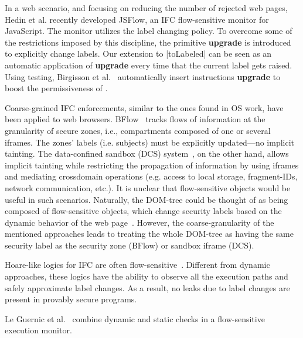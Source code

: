 In a web scenario, and focusing on reducing the number of rejected web pages,
Hedin et al. \citep{Hedin13} recently developed JSFlow, an IFC flow-sensitive
monitor for JavaScript. The monitor utilizes the {\nsu} label changing policy. To overcome some of the restrictions imposed by this discipline, the
primitive \textbf{upgrade} is introduced to explicitly change labels. Our
extension to |toLabeled| can be seen as an automatic application of
\textbf{upgrade} every time that the current label gets raised. Using testing,
Birgisson et al.~\citep{Arnar2012} automatically insert instructions
\textbf{upgrade} to boost the permissiveness of {\nsu}. 



Coarse-grained IFC enforcements, similar to the ones found in OS work, have been
applied to web browsers. BFlow~\citep{Yip:2009} tracks flows of information at
the granularity of secure zones, i.e., compartments composed of one or several
iframes. The zones' labels (i.e. subjects) must be explicitly updated---no
implicit tainting. The data-confined sandbox (DCS)
system~\citep{conf/esorics/AkhaweLHSS13}, on the other hand, allows implicit
tainting while restricting the propagation of information by using iframes and
mediating crossdomain operations (e.g. access to local storage, fragment-IDs,
network communication, etc.). It is unclear that flow-sensitive objects would be
useful in such scenarios. Naturally, the DOM-tree could be thought of as being
composed of flow-sensitive objects, which change security labels based on the
dynamic behavior of the web page~\citep{Russo:2009}. However, the
coarse-granularity of the mentioned approaches leads to treating the whole DOM-tree
as having the same security label as the security zone (BFlow) or sandbox iframe
(DCS). 

Hoare-like logics for IFC are often
flow-sensitive~\citep[e.g.][]{Amtoft:2006,Nanevski:2011}. Different from dynamic
approaches, these logics have the ability to observe all the execution paths and
safely approximate label changes. As a result, no leaks due to label changes are
present in provably secure programs.


Le Guernic et al.~\citep{LeGuernic:2006,Guernic:2007:ACM} combine dynamic and
static checks in a flow-sensitive execution monitor.
 



